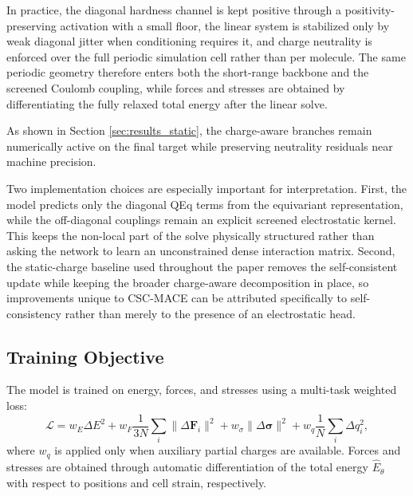 In practice, the diagonal hardness channel is kept positive through a positivity-preserving activation with a small floor, the linear system is stabilized only by weak diagonal jitter when conditioning requires it, and charge neutrality is enforced over the full periodic simulation cell rather than per molecule. The same periodic geometry therefore enters both the short-range backbone and the screened Coulomb coupling, while forces and stresses are obtained by differentiating the fully relaxed total energy after the linear solve.

As shown in Section \ref{sec:results_static}, the charge-aware branches remain numerically active on the final target while preserving neutrality residuals near machine precision.

Two implementation choices are especially important for interpretation. First, the model predicts only the diagonal QEq terms from the equivariant representation, while the off-diagonal couplings remain an explicit screened electrostatic kernel. This keeps the non-local part of the solve physically structured rather than asking the network to learn an unconstrained dense interaction matrix. Second, the static-charge baseline used throughout the paper removes the self-consistent update while keeping the broader charge-aware decomposition in place, so improvements unique to CSC-MACE can be attributed specifically to self-consistency rather than merely to the presence of an electrostatic head.

\subsection{Training Objective}
The model is trained on energy, forces, and stresses using a multi-task weighted loss:
\begin{equation}
    \mathcal{L} = w_E \Delta E^2 + w_F \frac{1}{3N} \sum_i \|\Delta \mathbf{F}_i\|^2 + w_\sigma \|\Delta \boldsymbol{\sigma}\|^2 + w_q \frac{1}{N} \sum_i \Delta q_i^2,
\end{equation}
where $w_q$ is applied only when auxiliary partial charges are available. Forces and stresses are obtained through automatic differentiation of the total energy $\hat{E}_\theta$ with respect to positions and cell strain, respectively.
